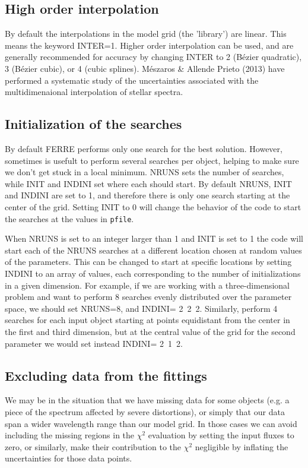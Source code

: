 \documentclass[12pt]{article}
\begin{document}
\subsection{High order interpolation}

By default the interpolations in the model grid (the 'library') are linear.
This means the keyword INTER=1. Higher order interpolation can be used, and
are generally recommended for accuracy by changing INTER to 2 (B\'ezier quadratic),
3 (B\'ezier cubic), or 4 (cubic splines). M\'eszaros \& Allende Prieto (2013) have
performed a systematic study of the uncertainties associated with the
multidimenaional interpolation of stellar spectra.

\subsection{Initialization of the searches}
\label{init}

By default FERRE performs only one search for the best solution.
However, sometimes is usefult to perform several searches per object,
helping to make sure we don't get stuck in a local minimum.
NRUNS sets the number of searches, while INIT and INDINI set where each should
start. By default NRUNS, INIT and INDINI are set to 1, and therefore there is
only one search starting at the center of the grid.
Setting INIT to 0 will change the behavior of the code to start the searches
at the values in {\tt pfile}. 

When NRUNS is set to an integer larger than
1 and INIT is set to 1 the code will start each of the NRUNS searches at a 
different location chosen at random values of the parameters. This can be changed 
to start at specific locations by setting INDINI to an array of values, each
corresponding to the number of initializations in a given dimension. For example,
if we are working with a three-dimensional problem and want to perform 8 searches
evenly distributed over the parameter space, we should set NRUNS=8, and
INDINI= 2~2~2.  Similarly, perform 4 searches for each input object 
starting at points equidistant from the center in the first and third dimension,
but at the central value of the grid for the second parameter we would set instead
INDINI= 2~1~2.

\subsection{Excluding data from the fittings}

We may be in the situation that we have missing data for some objects
(e.g. a piece of the spectrum affected by severe distortions), or
simply that our data span a wider wavelength range than our model grid.
In those cases  we can avoid including the missing regions in the 
$\chi^2$ evaluation by setting the input fluxes to zero, or similarly, 
make their contribution to the $\chi^2$ negligible by inflating the uncertainties
for those data points.
\end{document}
